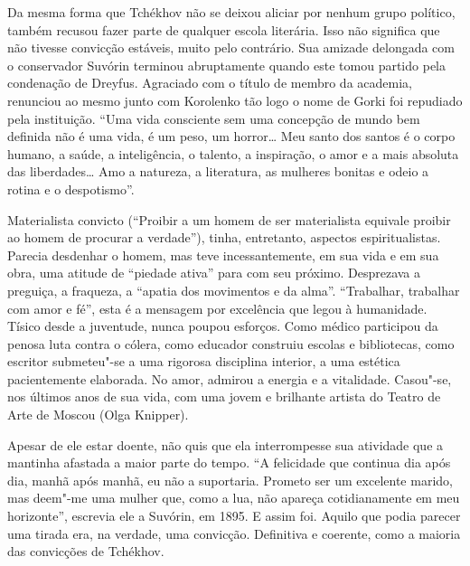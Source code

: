 {{Da mesma forma que Tchékhov não se deixou aliciar por nenhum grupo
político, também recusou fazer parte de qualquer escola literária. Isso
não significa que não tivesse convicção estáveis, muito pelo contrário.
Sua amizade delongada com o conservador Suvórin terminou abruptamente
quando este tomou partido pela condenação de Dreyfus. Agraciado com o
título de membro da academia, renunciou ao mesmo junto com Korolenko tão
logo o nome de Gorki foi repudiado pela instituição. ``Uma vida
consciente sem uma concepção de mundo bem definida não é uma vida, é um
peso, um horror\ldots{} Meu santo dos santos é o corpo humano, a saúde, a
inteligência, o talento, a inspiração, o amor e a mais absoluta das
liberdades\ldots{} Amo a natureza, a literatura, as mulheres bonitas e odeio
a rotina e o despotismo''.

Materialista convicto (``Proibir a um homem de ser materialista equivale
proibir ao homem de procurar a verdade''), tinha, entretanto, aspectos
espiritualistas. Parecia desdenhar o homem, mas teve incessantemente, em
sua vida e em sua obra, uma atitude de ``piedade ativa'' para com seu
próximo. Desprezava a preguiça, a fraqueza, a ``apatia dos movimentos e
da alma''. ``Trabalhar, trabalhar com amor e fé'', esta é a mensagem por
excelência que legou à humanidade. Tísico desde a juventude, nunca
poupou esforços. Como médico participou da penosa luta contra o cólera,
como educador construiu escolas e bibliotecas, como escritor submeteu"-se
a uma rigorosa disciplina interior, a uma estética pacientemente
elaborada. No amor, admirou a energia e a vitalidade. Casou"-se, nos
últimos anos de sua vida, com uma jovem e brilhante artista do Teatro de
Arte de Moscou (Olga Knipper).

Apesar de ele estar doente, não quis que ela interrompesse sua atividade
que a mantinha afastada a maior parte do tempo. ``A felicidade que
continua dia após dia, manhã após manhã, eu não a suportaria. Prometo
ser um excelente marido, mas deem"-me uma mulher que, como a lua, não
apareça cotidianamente em meu horizonte'', escrevia ele a Suvórin, em
1895. E assim foi. Aquilo que podia parecer uma tirada era, na verdade,
uma convicção. Definitiva e coerente, como a maioria das convicções de
Tchékhov.

}}
